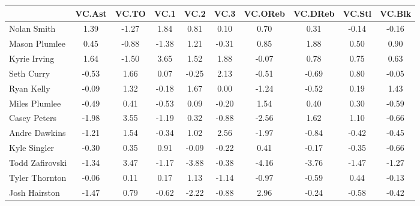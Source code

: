 \documentclass[10pt,letterpaper]{article}
\begin{document}
\begin{table}[ht]
\begin{center}
\begin{tabular}{lccccccccc}
  \hline
 & VC.Ast & VC.TO & VC.1 & VC.2 & VC.3 & VC.OReb & VC.DReb & VC.Stl & VC.Blk \\ 
  \hline
Nolan Smith & 1.39 & -1.27 & 1.84 & 0.81 & 0.10 & 0.70 & 0.31 & -0.14 & -0.16 \\ 
  Mason Plumlee & 0.45 & -0.88 & -1.38 & 1.21 & -0.31 & 0.85 & 1.88 & 0.50 & 0.90 \\ 
  Kyrie Irving & 1.64 & -1.50 & 3.65 & 1.52 & 1.88 & -0.07 & 0.78 & 0.75 & 0.63 \\ 
  Seth Curry & -0.53 & 1.66 & 0.07 & -0.25 & 2.13 & -0.51 & -0.69 & 0.80 & -0.05 \\ 
  Ryan Kelly & -0.09 & 1.32 & -0.18 & 1.67 & 0.00 & -1.24 & -0.52 & 0.19 & 1.43 \\ 
  Miles Plumlee & -0.49 & 0.41 & -0.53 & 0.09 & -0.20 & 1.54 & 0.40 & 0.30 & -0.59 \\ 
  Casey Peters & -1.98 & 3.55 & -1.19 & 0.32 & -0.88 & -2.56 & 1.62 & 1.10 & -0.66 \\ 
  Andre Dawkins & -1.21 & 1.54 & -0.34 & 1.02 & 2.56 & -1.97 & -0.84 & -0.42 & -0.45 \\ 
  Kyle Singler & -0.30 & 0.35 & 0.91 & -0.09 & -0.22 & 0.41 & -0.17 & -0.35 & -0.66 \\ 
  Todd Zafirovski & -1.34 & 3.47 & -1.17 & -3.88 & -0.38 & -4.16 & -3.76 & -1.47 & -1.27 \\ 
  Tyler Thornton & -0.06 & 0.11 & 0.17 & 1.13 & -1.14 & -0.97 & -0.59 & 0.44 & -0.13 \\ 
  Josh Hairston & -1.47 & 0.79 & -0.62 & -2.22 & -0.88 & 2.96 & -0.24 & -0.58 & -0.42 \\ 
   \hline
\end{tabular}
\end{center}
\end{table}
\end{document}
